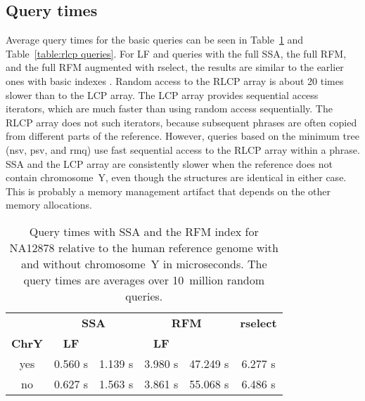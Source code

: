 \documentclass[a4paper,11pt]{llncs}
\newcommand{\SSA}{\textsf{SSA}}
\newcommand{\RFM}{\textsf{RFM}}
\newcommand{\LCP}{\textsf{LCP}}
\newcommand{\RLCP}{\textsf{RLCP}}
\newcommand{\rselect}{\textsf{rselect}}
\newcommand{\LF}{\textsf{LF}}
\newcommand{\Psiop}{\textsf{\textPsi}}
\newcommand{\nsv}{\textsf{nsv}}
\newcommand{\psv}{\textsf{psv}}
\newcommand{\rmq}{\textsf{rmq}}
\newcommand{\mus}{\textmu{}s}
\begin{document}
\subsection{Query times}

Average query times for the basic queries can be seen in Table~\ref{table:rfm queries} and Table~\ref{table:rlcp queries}. For \LF{} and \Psiop{} queries with the full \SSA{}, the full \RFM, and the full \RFM{} augmented with \rselect, the results are similar to the earlier ones with basic indexes \cite{Boucher2015}. Random access to the \RLCP{} array is about 20 times slower than to the \LCP{} array. The \LCP{} array provides sequential access iterators, which are much faster than using random access sequentially. The \RLCP{} array does not such iterators, because subsequent phrases are often copied from different parts of the reference. However, queries based on the minimum tree (\nsv, \psv, and \rmq) use fast sequential access to the \RLCP{} array within a phrase. \SSA{} and the \LCP{} array are consistently slower when the reference does not contain chromosome~Y, even though the structures are identical in either case. This is probably a memory management artifact that depends on the other memory allocations.

\begin{table}
\caption{Query times with \SSA{} and the \RFM{} index for NA12878 relative to the human reference genome with and without chromosome~Y in microseconds. The query times are averages over 10~million random queries.}\label{table:rfm queries}
\setlength{\extrarowheight}{2pt}
\setlength{\tabcolsep}{3pt}
\begin{center}
\begin{tabular}{c|cc|cc|c}
\hline
 & \multicolumn{2}{c|}{\textbf{\SSA}} & \multicolumn{2}{c|}{\textbf{\RFM}} & \textbf{\rselect} \\
\textbf{ChrY} & \textbf{\LF} & \textbf{\Psiop} & \textbf{\LF} & \textbf{\Psiop} & \textbf{\Psiop} \\
\hline
yes & 0.560 \mus & 1.139 \mus & 3.980 \mus & 47.249 \mus & 6.277 \mus \\
no  & 0.627 \mus & 1.563 \mus & 3.861 \mus & 55.068 \mus & 6.486 \mus \\
\hline
\end{tabular}
\end{center}
\end{table}
\end{document}
